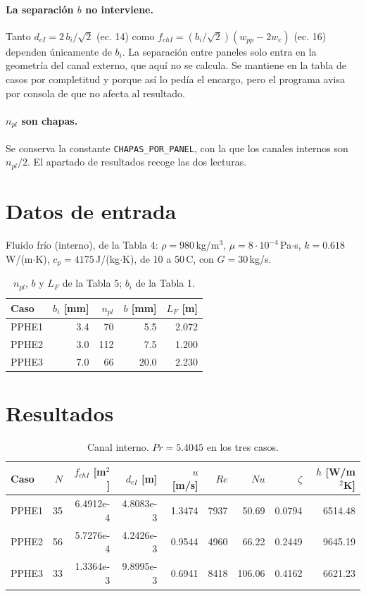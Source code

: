 \documentclass[11pt,a4paper]{article}
\begin{document}
\paragraph{La separación $b$ no interviene.} Tanto $d_{eI} = 2\,b_i/\sqrt{2}$ (ec. 14) como
$f_{chI} = (b_i/\sqrt{2})(w_{pp}-2w_e)$ (ec. 16) dependen únicamente de $b_i$. La separación
entre paneles solo entra en la geometría del canal externo, que aquí no se calcula. Se
mantiene en la tabla de casos por completitud y porque así lo pedía el encargo, pero el
programa avisa por consola de que no afecta al resultado.

\paragraph{$n_{pl}$ son chapas.} Se conserva la constante \texttt{CHAPAS\_POR\_PANEL}, con la
que los canales internos son $n_{pl}/2$. El apartado de resultados recoge las dos lecturas.

\section{Datos de entrada}

Fluido frío (interno), de la Tabla 4: $\rho=980$\,kg/m$^3$, $\mu=8\cdot10^{-4}$\,Pa$\cdot$s,
$k=0.618$\,W/(m$\cdot$K), $c_p=4175$\,J/(kg$\cdot$K), de 10 a 50\,\textdegree C, con
$G=30$\,kg/s.

\begin{table}[h]
\centering
\begin{tabular}{lrrrr}
\toprule
Caso & $b_i$ [mm] & $n_{pl}$ & $b$ [mm] & $L_F$ [m]\\
\midrule
PPHE1 & 3.4 &  70 &  5.5 & 2.072\\
PPHE2 & 3.0 & 112 &  7.5 & 1.200\\
PPHE3 & 7.0 &  66 & 20.0 & 2.230\\
\bottomrule
\end{tabular}
\caption{$n_{pl}$, $b$ y $L_F$ de la Tabla 5; $b_i$ de la Tabla 1.}
\end{table}

\section{Resultados}

\begin{table}[h]
\centering
\small
\begin{tabular}{lrrrrrrrr}
\toprule
Caso & $N$ & $f_{chI}$ [m$^2$] & $d_{eI}$ [m] & $u$ [m/s] & $Re$ & $Nu$ & $\zeta$ & $h$ [W/m$^2$K]\\
\midrule
PPHE1 & 35 & 6.4912e-4 & 4.8083e-3 & 1.3474 & 7937 &  50.69 & 0.0794 & 6514.48\\
PPHE2 & 56 & 5.7276e-4 & 4.2426e-3 & 0.9544 & 4960 &  66.22 & 0.2449 & 9645.19\\
PPHE3 & 33 & 1.3364e-3 & 9.8995e-3 & 0.6941 & 8418 & 106.06 & 0.4162 & 6621.23\\
\bottomrule
\end{tabular}
\caption{Canal interno. $Pr = 5.4045$ en los tres casos.}
\end{table}
\end{document}
